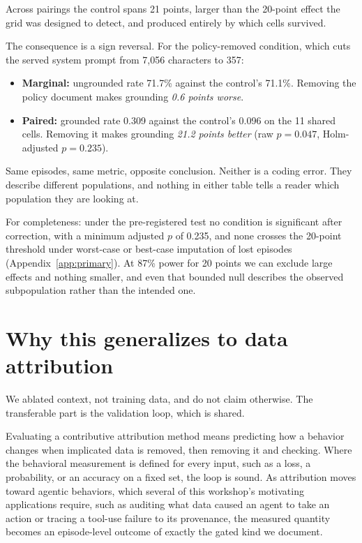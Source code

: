 \documentclass{article}
\begin{document}
Across pairings the control spans 21 points, larger than the 20-point effect the grid
was designed to detect, and produced entirely by which cells survived.

The consequence is a sign reversal. For the policy-removed condition, which cuts the
served system prompt from 7{,}056 characters to 357:

\begin{itemize}
\item \textbf{Marginal:} ungrounded rate 71.7\% against the control's 71.1\%. Removing
the policy document makes grounding \emph{0.6 points worse}.
\item \textbf{Paired:} grounded rate 0.309 against the control's 0.096 on the 11 shared
cells. Removing it makes grounding \emph{21.2 points better} (raw $p = 0.047$,
Holm-adjusted $p = 0.235$).
\end{itemize}

Same episodes, same metric, opposite conclusion. Neither is a coding error. They
describe different populations, and nothing in either table tells a reader which
population they are looking at.

For completeness: under the pre-registered test no condition is significant after
correction, with a minimum adjusted $p$ of 0.235, and none crosses the 20-point
threshold under worst-case or best-case imputation of lost episodes
(Appendix~\ref{app:primary}). At 87\% power for 20 points we can exclude large effects
and nothing smaller, and even that bounded null describes the observed subpopulation
rather than the intended one.

\section{Why this generalizes to data attribution}

We ablated context, not training data, and do not claim otherwise. The transferable
part is the validation loop, which is shared.

Evaluating a contributive attribution method means predicting how a behavior changes
when implicated data is removed, then removing it and checking. Where the behavioral
measurement is defined for every input, such as a loss, a probability, or an accuracy
on a fixed set, the loop is sound. As attribution moves toward agentic behaviors, which
several of this workshop's motivating applications require, such as auditing what data
caused an agent to take an action or tracing a tool-use failure to its provenance, the
measured quantity becomes an episode-level outcome of exactly the gated kind we
document.
\end{document}
